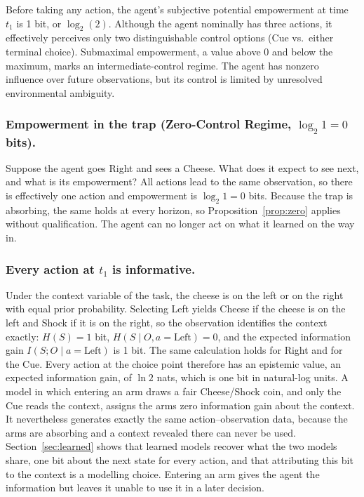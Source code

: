 \documentclass[pdflatex,sn-apa]{sn-jnl}%
\theoremstyle{definition}
\begin{document}
Before taking any action, the agent's subjective potential empowerment at time $t_1$ is 1 bit, or $\log_2(2)$. Although the agent nominally has three actions, it effectively perceives only two distinguishable control options (Cue vs.\ either terminal choice). Submaximal empowerment, a value above 0 and below the maximum, marks an intermediate-control regime. The agent has nonzero influence over future observations, but its control is limited by unresolved environmental ambiguity.

\subsubsection{Empowerment in the trap (Zero-Control Regime, \texorpdfstring{$\log_2 1 = 0$}{log2 1 = 0} bits).}
Suppose the agent goes Right and sees a Cheese. What does it expect to see next, and what is its empowerment? All actions lead to the same observation, so there is effectively one action and empowerment is $\log_2 1 = 0$ bits. Because the trap is absorbing, the same holds at every horizon, so Proposition~\ref{prop:zero} applies without qualification. The agent can no longer act on what it learned on the way in.

\subsubsection{Every action at \texorpdfstring{$t_1$}{t1} is informative.}\label{sec:efe}
Under the context variable of the task, the cheese is on the left or on the right with equal prior probability. Selecting Left yields Cheese if the cheese is on the left and Shock if it is on the right, so the observation identifies the context exactly: $H(S) = 1$ bit, $H(S \mid O, a = \text{Left}) = 0$, and the expected information gain $I(S; O \mid a = \text{Left})$ is 1 bit. The same calculation holds for Right and for the Cue. Every action at the choice point therefore has an epistemic value, an expected information gain, of $\ln 2$ nats, which is one bit in natural-log units. A model in which entering an arm draws a fair Cheese/Shock coin, and only the Cue reads the context, assigns the arms zero information gain about the context. It nevertheless generates exactly the same action--observation data, because the arms are absorbing and a context revealed there can never be used. Section~\ref{sec:learned} shows that learned models recover what the two models share, one bit about the next state for every action, and that attributing this bit to the context is a modelling choice. Entering an arm gives the agent the information but leaves it unable to use it in a later decision.
\end{document}
